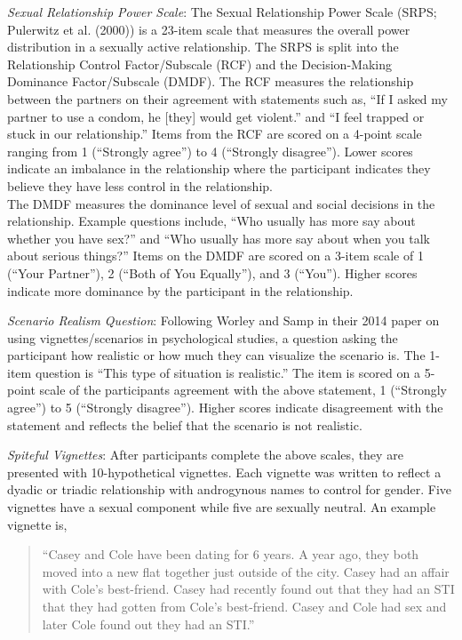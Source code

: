 \documentclass[
  english,
  a4paper]{apa7}
\begin{document}
\emph{Sexual Relationship Power Scale}:
The Sexual Relationship Power Scale (SRPS; Pulerwitz et al. (2000)) is a 23-item scale that measures the overall power distribution in a sexually active relationship. The SRPS is split into the Relationship Control Factor/Subscale (RCF) and the Decision-Making Dominance Factor/Subscale (DMDF). The RCF measures the relationship between the partners on their agreement with statements such as, ``If I asked my partner to use a condom, he {[}they{]} would get violent.'' and ``I feel trapped or stuck in our relationship.'' Items from the RCF are scored on a 4-point scale ranging from 1 (``Strongly agree'') to 4 (``Strongly disagree''). Lower scores indicate an imbalance in the relationship where the participant indicates they believe they have less control in the relationship.\\
The DMDF measures the dominance level of sexual and social decisions in the relationship. Example questions include, ``Who usually has more say about whether you have sex?'' and ``Who usually has more say about when you talk about serious things?'' Items on the DMDF are scored on a 3-item scale of 1 (``Your Partner''), 2 (``Both of You Equally''), and 3 (``You''). Higher scores indicate more dominance by the participant in the relationship.

\emph{Scenario Realism Question}:
Following Worley and Samp in their 2014 paper on using vignettes/scenarios in psychological studies, a question asking the participant how realistic or how much they can visualize the scenario is. The 1-item question is ``This type of situation is realistic.'' The item is scored on a 5-point scale of the participants agreement with the above statement, 1 (``Strongly agree'') to 5 (``Strongly disagree''). Higher scores indicate disagreement with the statement and reflects the belief that the scenario is not realistic.

\emph{Spiteful Vignettes}:
After participants complete the above scales, they are presented with 10-hypothetical vignettes. Each vignette was written to reflect a dyadic or triadic relationship with androgynous names to control for gender. Five vignettes have a sexual component while five are sexually neutral. An example vignette is,

\begin{quote}
``Casey and Cole have been dating for 6 years. A year ago, they both moved into a new flat together just outside of the city. Casey had an affair with Cole's best-friend. Casey had recently found out that they had an STI that they had gotten from Cole's best-friend. Casey and Cole had sex and later Cole found out they had an STI.''
\end{quote}
\end{document}
